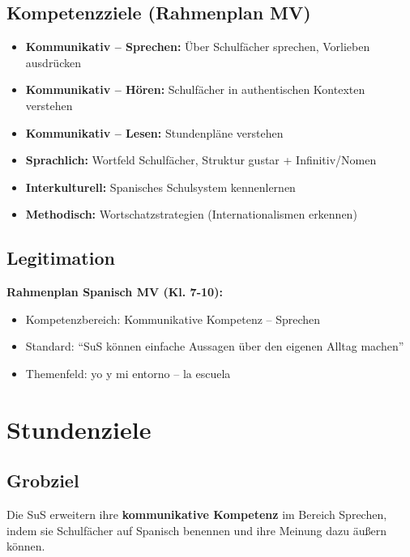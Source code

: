 \documentclass[11pt,a4paper]{article}
\begin{document}
\subsection{Kompetenzziele (Rahmenplan MV)}
\begin{itemize}
    \item \textbf{Kommunikativ -- Sprechen:} Über Schulfächer sprechen, Vorlieben ausdrücken
    \item \textbf{Kommunikativ -- Hören:} Schulfächer in authentischen Kontexten verstehen
    \item \textbf{Kommunikativ -- Lesen:} Stundenpläne verstehen
    \item \textbf{Sprachlich:} Wortfeld Schulfächer, Struktur gustar + Infinitiv/Nomen
    \item \textbf{Interkulturell:} Spanisches Schulsystem kennenlernen
    \item \textbf{Methodisch:} Wortschatzstrategien (Internationalismen erkennen)
\end{itemize}

\subsection{Legitimation}
\textbf{Rahmenplan Spanisch MV (Kl. 7-10):}
\begin{itemize}
    \item Kompetenzbereich: Kommunikative Kompetenz -- Sprechen
    \item Standard: ``SuS können einfache Aussagen über den eigenen Alltag machen''
    \item Themenfeld: yo y mi entorno -- la escuela
\end{itemize}

\section{Stundenziele}

\subsection{Grobziel}
Die SuS erweitern ihre \textbf{kommunikative Kompetenz} im Bereich Sprechen, indem sie Schulfächer auf Spanisch benennen und ihre Meinung dazu äußern können.
\end{document}

